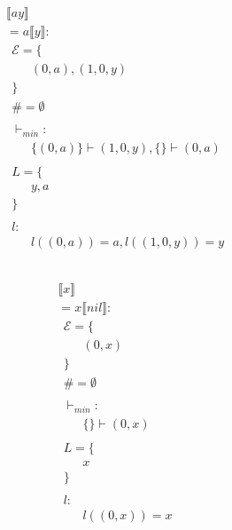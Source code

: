 \begin{align*} 
	 &  & \\ 
	 & \llbracket ay \rrbracket & \\ 
	 & = a\llbracket y \rrbracket:  & \\ 
	 & \ \ \mathcal{{E}}= \{  & \\ 
	 & \qquad (0, a), (1, 0, y) \\ 
	 & \ \ \} & \\ 
	 & \ \ \# = \emptyset & \\ 
	 & \ \  & \\ 
	 & \ \ \vdash_{{min}}: & \\ 
	 & \qquad \{ (0, a) \} \vdash (1, 0, y), \{  \} \vdash (0, a) \\ 
	 & \ \  & \\ 
	 & \ \ L=\{ & \\ 
	 & \qquad y, a \\ 
	 & \ \ \} & \\ 
	 & \ \  & \\ 
	 & \ \ l: & \\ 
	 & \qquad l((0, a)) = a, l((1, 0, y)) = y \\ 
	 & \ \  & \\ 
\end{align*} 

\begin{align*} 
	 &  & \\ 
	 & \llbracket x \rrbracket & \\ 
	 & = x\llbracket nil \rrbracket:  & \\ 
	 & \ \ \mathcal{{E}}= \{  & \\ 
	 & \qquad (0, x) \\ 
	 & \ \ \} & \\ 
	 & \ \ \# = \emptyset & \\ 
	 & \ \  & \\ 
	 & \ \ \vdash_{{min}}: & \\ 
	 & \qquad \{  \} \vdash (0, x) \\ 
	 & \ \  & \\ 
	 & \ \ L=\{ & \\ 
	 & \qquad x \\ 
	 & \ \ \} & \\ 
	 & \ \  & \\ 
	 & \ \ l: & \\ 
	 & \qquad l((0, x)) = x \\ 
	 & \ \  & \\ 
\end{align*} 

